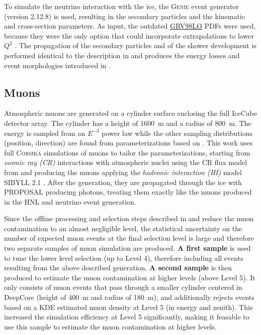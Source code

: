 To simulate the neutrino interaction with the ice, the \textsc{Genie} event generator  (version 2.12.8) is used, resulting in the secondary particles and the kinematic and cross-section parameters. As input, the outdated \href{https://internal.dunescience.org/doxygen/classgenie_1_1GRV89LO.html}{GRV98LO}  PDFs were used, because they were the only option that could incorporate extrapolations to lower $Q^2$ . The propagation of the secondary particles and of the shower development is performed identical to the description in  and produces the energy losses and event morphologies introduced in .


\subsection{Muons}

Atmospheric muons are generated on a cylinder surface enclosing the full IceCube detector array. The cylinder has a height of \SI{1600}{\meter} and a radius of \SI{800}{\meter}. The energy is sampled from an $E^{-3}$ power law while the other sampling distributions (position, direction) are found from parameterizations based on . This work uses full \textsc{Corsika}  simulations of muons to tailor the parameterizations, starting from \textit{cosmic ray (CR)} interactions with atmospheric nuclei using the CR flux model from  and producing the muons applying the \textit{hadronic interaction (HI)} model SIBYLL 2.1 . After the generation, they are propagated through the ice with PROPOSAL producing photons, treating them exactly like the muons produced in the HNL and neutrino event generation.

Since the offline processing and selection steps described in  and  reduce the muon contamination to an almost negligible level, the statistical uncertainty on the number of expected muon events at the final selection level is large and therefore two separate samples of muon simulation are produced. \textbf{A first sample} is used to tune the lower level selection (up to Level 4), therefore including all events resulting from the above described generation. \textbf{A second sample} is then produced to estimate the muon contamination at higher levels (above Level 5). It only consists of muon events that pass through a smaller cylinder centered in DeepCore (height of \SI{400}{\meter} and radius of \SI{180}{\meter}), and additionally rejects events based on a KDE estimated muon density at Level 5 (in energy and zenith). This increased the simulation efficiency at Level 5 significantly, making it feasable to use this sample to estimate the muon contamination at higher levels.


